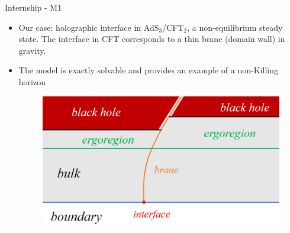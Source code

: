 \documentclass{beamer}
\begin{document}
\begin{frame}{Internship - M1}
\begin{itemize}

\item 
Our case: holographic interface in AdS$_3$/CFT$_2$, a non-equilibrium steady state.
The interface in CFT corresponds to a thin brane (domain wall) in gravity.

\item
The model is exactly solvable and provides an example of a non-Killing horizon



\begin{figure}[htb]
    \centering
    \includegraphics[scale=0.4]{Figures/btz.png}
\end{figure}

\end{itemize}
\end{frame}
\end{document}

